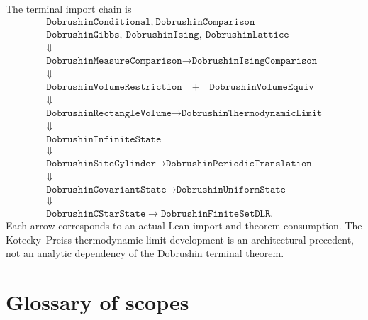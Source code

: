 \documentclass[11pt]{article}
\theoremstyle{definition}
\begin{document}
The terminal import chain is
\[
\begin{array}{c}
\texttt{DobrushinConditional},\ 
\texttt{DobrushinComparison}\\[-0.1em]
\texttt{DobrushinGibbs},\ 
\texttt{DobrushinIsing},\ 
\texttt{DobrushinLattice}\\[0.3em]
\Downarrow\\[-0.1em]
\texttt{DobrushinMeasureComparison}
\longrightarrow
\texttt{DobrushinIsingComparison}\\[0.3em]
\Downarrow\\[-0.1em]
\texttt{DobrushinVolumeRestriction}
\quad+
\quad\texttt{DobrushinVolumeEquiv}\\[0.3em]
\Downarrow\\[-0.1em]
\texttt{DobrushinRectangleVolume}
\longrightarrow
\texttt{DobrushinThermodynamicLimit}\\[0.3em]
\Downarrow\\[-0.1em]
\texttt{DobrushinInfiniteState}\\[0.3em]
\Downarrow\\[-0.1em]
\texttt{DobrushinSiteCylinder}
\longrightarrow
\texttt{DobrushinPeriodicTranslation}\\[0.3em]
\Downarrow\\[-0.1em]
\texttt{DobrushinCovariantState}
\longrightarrow
\texttt{DobrushinUniformState}\\[0.3em]
\Downarrow\\[-0.1em]
\texttt{DobrushinCStarState}
\longrightarrow
\texttt{DobrushinFiniteSetDLR}.
\end{array}
\]
Each arrow corresponds to an actual Lean import and theorem consumption.  The
Kotecky--Preiss thermodynamic-limit development is an architectural precedent,
not an analytic dependency of the Dobrushin terminal theorem.

\section{Glossary of scopes}
\end{document}
